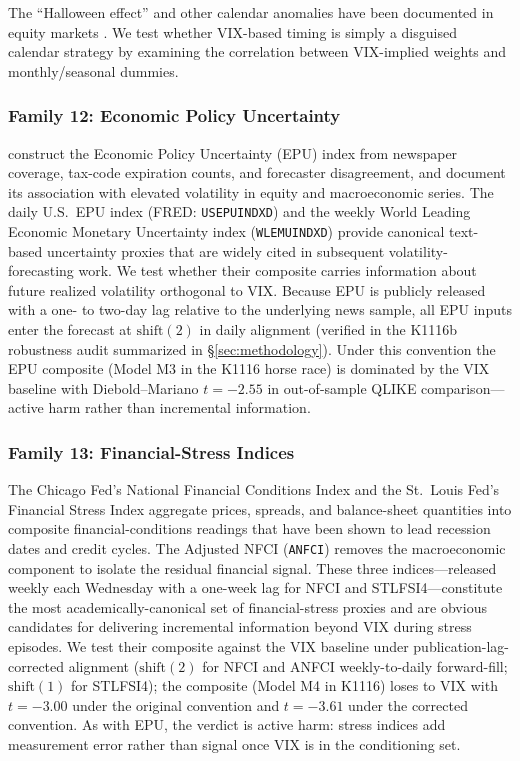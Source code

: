 \documentclass[12pt,a4paper]{article}
\begin{document}
The ``Halloween effect'' and other calendar anomalies have been documented in equity markets \citep{bouman2002}. We test whether VIX-based timing is simply a disguised calendar strategy by examining the correlation between VIX-implied weights and monthly/seasonal dummies.

\subsubsection{Family 12: Economic Policy Uncertainty}

\citet{baker2016} construct the Economic Policy Uncertainty (EPU) index from newspaper coverage, tax-code expiration counts, and forecaster disagreement, and document its association with elevated volatility in equity and macroeconomic series. The daily U.S.\ EPU index (FRED: \texttt{USEPUINDXD}) and the weekly World Leading Economic Monetary Uncertainty index (\texttt{WLEMUINDXD}) provide canonical text-based uncertainty proxies that are widely cited in subsequent volatility-forecasting work. We test whether their composite carries information about future realized volatility orthogonal to VIX. Because EPU is publicly released with a one- to two-day lag relative to the underlying news sample, all EPU inputs enter the forecast at $\text{shift}(2)$ in daily alignment (verified in the K1116b robustness audit summarized in \S\ref{sec:methodology}). Under this convention the EPU composite (Model M3 in the K1116 horse race) is dominated by the VIX baseline with Diebold--Mariano $t=-2.55$ in out-of-sample QLIKE comparison---active harm rather than incremental information.

\subsubsection{Family 13: Financial-Stress Indices}

The Chicago Fed's National Financial Conditions Index \citep[NFCI;][]{brave2011} and the St.\ Louis Fed's Financial Stress Index \citep[STLFSI;][]{kliesen2010} aggregate prices, spreads, and balance-sheet quantities into composite financial-conditions readings that have been shown to lead recession dates and credit cycles. The Adjusted NFCI (\texttt{ANFCI}) removes the macroeconomic component to isolate the residual financial signal. These three indices---released weekly each Wednesday with a one-week lag for NFCI and STLFSI4---constitute the most academically-canonical set of financial-stress proxies and are obvious candidates for delivering incremental information beyond VIX during stress episodes. We test their composite against the VIX baseline under publication-lag-corrected alignment ($\text{shift}(2)$ for NFCI and ANFCI weekly-to-daily forward-fill; $\text{shift}(1)$ for STLFSI4); the composite (Model M4 in K1116) loses to VIX with $t=-3.00$ under the original convention and $t=-3.61$ under the corrected convention. As with EPU, the verdict is active harm: stress indices add measurement error rather than signal once VIX is in the conditioning set.
\end{document}
